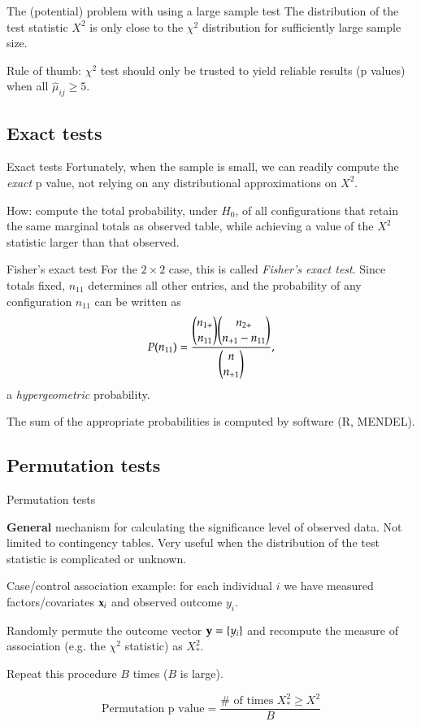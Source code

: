 \documentclass[serif,mathserif,professionalfonts]{beamer}
\begin{document}
\begin{frame}{The (potential) problem with using a large sample test}
  The distribution of the test statistic $X^2$ is only close to
  the $\chi^2$ distribution for sufficiently large sample size.

  Rule of thumb: $\chi^2$ test should only be trusted to yield
  reliable results (p values) when all $\hat{\mu}_{ij} \geq 5$.
\end{frame}


\subsection{Exact tests}

\begin{frame}{Exact tests}
  Fortunately, when the sample is small, we can readily compute the
  \emph{exact} p value, not relying on any distributional
  approximations on $X^2$.

  How: compute the total probability, under $H_0$, of all
  configurations that retain the same marginal totals as observed
  table, while achieving a value of the $X^2$ statistic larger than
  that observed.
\end{frame}

\begin{frame}{Fisher's exact test}
  For the $2 \times 2$ case, this is called \emph{Fisher's exact
    test}.  Since totals fixed, $n_{11}$ determines all other entries,
  and the probability of any configuration $n_{11}$ can be written as
  \begin{align*}
     P(n_{11}) = 
      \frac{\dbinom{n_{1+}}{n_{11}} \dbinom{n_{2+}}{n_{+1}-n_{11}}} 
           {\dbinom{n}{n_{+1}}},
  \end{align*}
  a \emph{hypergeometric} probability.

 The sum of the appropriate probabilities is computed by software (R, MENDEL).
\end{frame}


\subsection{Permutation tests}

\begin{frame}{Permutation tests}

  {\bf General} mechanism for calculating the significance level of
  observed data.  Not limited to contingency tables.  Very useful when
  the distribution of the test statistic is complicated or unknown.

  Case/control association example: for each individual $i$ we have
  measured factors/covariates ${\bf x}_i$ and observed outcome $y_i$.

  Randomly permute the outcome vector ${\bf y}=\{y_i\}$ and recompute
  the measure of association (e.g. the $\chi^2$ statistic) as $X_*^2$.

  Repeat this procedure $B$ times ($B$ is large).

  $$\text{Permutation p value} = 
  \frac{ \# \text{ of times } X_*^2 \geq X^2}{B}
  $$
\end{frame}
\end{document}
